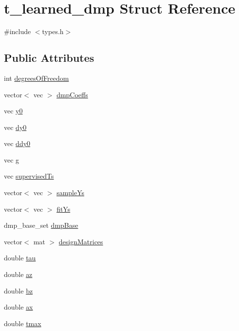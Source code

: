 \hypertarget{structt__learned__dmp}{\section{t\-\_\-learned\-\_\-dmp \-Struct \-Reference}
\label{structt__learned__dmp}
}


{\ttfamily \#include $<$types.\-h$>$}

\subsection*{\-Public \-Attributes}
\begin{DoxyCompactItemize}
\item 
int \hyperlink{structt__learned__dmp_aa95fa8f54e4304a18b701183e229a122}{degrees\-Of\-Freedom}
\item 
vector$<$ vec $>$ \hyperlink{structt__learned__dmp_a5e4633b96b5289f22aa40dda0c5815da}{dmp\-Coeffs}
\item 
vec \hyperlink{structt__learned__dmp_a918c713e63cd441d7764bb4757194aa7}{y0}
\item 
vec \hyperlink{structt__learned__dmp_a3d1a7d349057d4f9f1ba8534c6530e01}{dy0}
\item 
vec \hyperlink{structt__learned__dmp_ad8c415789299b3ded30c0e1df84c899e}{ddy0}
\item 
vec \hyperlink{structt__learned__dmp_a90c4955fe578eeb96f2832494fe7a362}{g}
\item 
vec \hyperlink{structt__learned__dmp_a4d705a7f8b60ac3012e4ba223cab42ef}{supervised\-Ts}
\item 
vector$<$ vec $>$ \hyperlink{structt__learned__dmp_a617a640048f690d6b713a63b0d379685}{sample\-Ys}
\item 
vector$<$ vec $>$ \hyperlink{structt__learned__dmp_aec1fa14a8ba81fe3e26bd53c365a8841}{fit\-Ys}
\item 
dmp\-\_\-base\-\_\-set \hyperlink{structt__learned__dmp_aa7da401e9271f376d9faf7ac28121c81}{dmp\-Base}
\item 
vector$<$ mat $>$ \hyperlink{structt__learned__dmp_a231b45576b9b819187d084459afe7b66}{design\-Matrices}
\item 
double \hyperlink{structt__learned__dmp_a0c81fa28d11df6e40b894496fddcb2a9}{tau}
\item 
double \hyperlink{structt__learned__dmp_ad2f53d36140780f2ac8ef1942282b5b8}{az}
\item 
double \hyperlink{structt__learned__dmp_a399840eaaf10b110bc2303d9ac82d60d}{bz}
\item 
double \hyperlink{structt__learned__dmp_ac0656ef16f7e7e2dd32d5798f2accb8e}{ax}
\item 
double \hyperlink{structt__learned__dmp_a31eb510344d4370e28562076d9b7d532}{tmax}
\end{DoxyCompactItemize}


